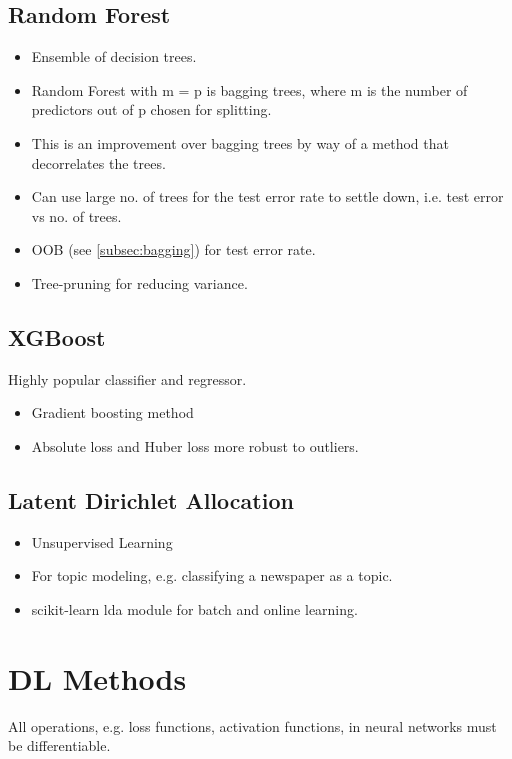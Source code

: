 \documentclass[a4paper, 12pt]{report}
\begin{document}
\section{Random Forest}
\begin{itemize}
\item Ensemble of decision trees.
\item Random Forest with m = p is bagging trees, where m is the number of predictors out of p chosen for splitting.
\item This is an improvement over bagging trees by way of a method that decorrelates the trees.
\item Can use large no. of trees for the test error rate to settle down, i.e. test error vs no. of trees.
\item OOB (see  \autoref{subsec:bagging}) for test error rate.
\item Tree-pruning for reducing variance.
\end{itemize}

\section{XGBoost}
Highly popular classifier and regressor. 
\begin{itemize}
\item Gradient boosting method
\item Absolute loss and Huber loss more robust to outliers.
\end{itemize}

\section{Latent Dirichlet Allocation}
\begin{itemize}
\item Unsupervised Learning
\item For topic modeling, e.g. classifying a newspaper as a topic.
\item {\color{cyan}scikit-learn lda module} for batch and online learning.
\end{itemize}

\chapter{DL Methods}
All operations, e.g. loss functions, activation functions, in neural networks must be differentiable.
\end{document}
